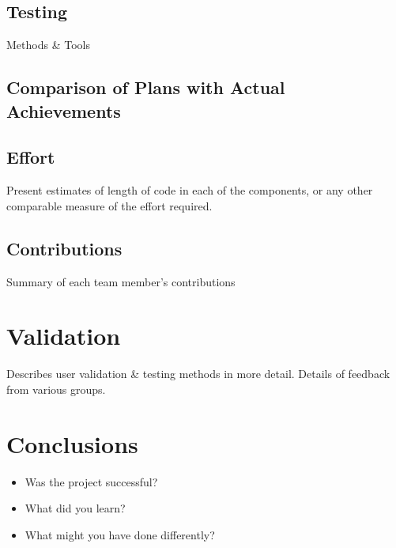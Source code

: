 \documentclass[10pt]{report}
\begin{document}
\section{Testing}
Methods \& Tools

\section{Comparison of Plans with Actual Achievements }

\section{Effort}
Present estimates of length of code in each of the components, or any other comparable measure of the effort required.

\section{Contributions}
Summary of each team member's contributions 


\chapter{Validation}
Describes user validation \& testing methods in more detail.
Details of feedback from various groups.

\chapter{Conclusions}
  \begin{itemize} 
  \item Was the project successful?
  \item What did you learn?
  \item What might you have done differently?
  \end{itemize}  
\end{document}

